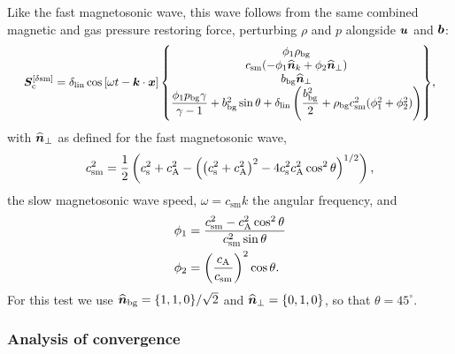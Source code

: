 Like the fast magnetosonic wave, this wave follows from the same combined magnetic and gas pressure restoring force, perturbing $\rho$ and $p$ alongside $\bm{u}$ and $\bm{b}$:
\begin{align}
    \scalebox{0.925}{$\displaystyle
    \mVector{S}_\mathrm{c}^{[\delta\mathrm{sm}]}
        = \delta_\mathrm{lin} \cos\sbrac{
                \omega t - \mVector{k}\cdot\mVector{x}
            }
            \begin{Bmatrix}
                \phi_1 \rho_\mathrm{bg} \\
                c_\mathrm{sm} (
                        -\phi_1 \mVectorUnit{n}_{k}
                        + \phi_2 \mVectorUnit{n}_\perp
                    ) \\
                b_\mathrm{bg} \mVectorUnit{n}_\perp \\
                \dfrac{\phi_1 p_\mathrm{bg} \gamma}{\gamma-1}
                    + b_\mathrm{bg}^2\sin\theta
                    + \delta_\mathrm{lin} \rbrac{
                            \dfrac{b_\mathrm{bg}^2}{2}
                            + \rho_\mathrm{bg} c_\mathrm{sm}^2 (\phi_1^2 + \phi_2^2)
                        }
            \end{Bmatrix}
    $} ,
\end{align}
with $\widehat{\bm{n}}_\perp$ as defined for the fast magnetosonic wave,
\begin{align}
    c_\mathrm{sm}^2
        = \frac{1}{2}\left( 
            c_\mathrm{s}^2
            + c_\mathrm{A}^2
            - \left( 
                    \left( c_\mathrm{s}^2
                    + c_\mathrm{A}^2 \right)^2
                    - 4 c_\mathrm{s}^2 c_\mathrm{A}^2 \cos^2\theta
                 \right)^{1/2}
         \right)
    , \label{eqn:waves:slow-speed}
\end{align}
the slow magnetosonic wave speed, $\omega = c_\mathrm{sm} k$ the angular frequency, and
\begin{align}
    \phi_1
        &= \frac{
            c_\mathrm{sm}^2 - c_\mathrm{A}^2\cos^2\theta
        }{
            c_\mathrm{sm}^2 \sin\theta
        } \\
    \phi_2
        &= \left( \frac{c_\mathrm{A}}{c_\mathrm{sm}} \right)^2 \cos\theta
    .
\end{align}
For this test we use $\widehat{\bm{n}}_\mathrm{bg} = \{1,1,0\}/\sqrt{2}$ and $\widehat{\bm{n}}_\perp = \{0,1,0\}$, so that $\theta = 45^\circ$.

\subsubsection{Analysis of convergence}

